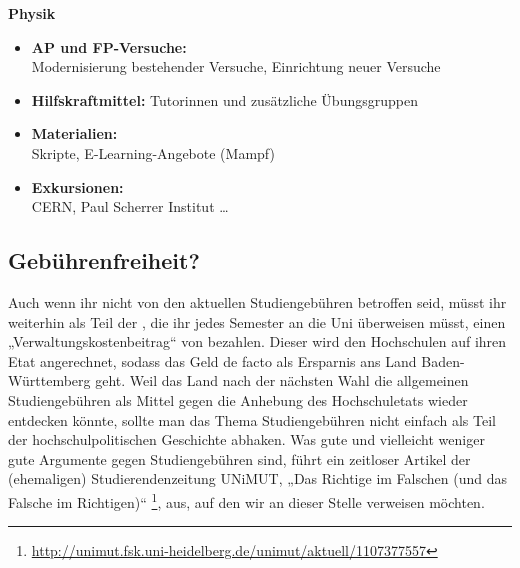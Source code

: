 \noindent\textbf{Physik}
\begin{itemize}
\item \textbf{\gls{AP} und \gls{FP}-Versuche:}\\
	Modernisierung bestehender Versuche, Einrichtung neuer Versuche
\item \textbf{Hilfskraftmittel:}
	Tutorinnen und zusätzliche Übungsgruppen
\item \textbf{Materialien:}\\
	Skripte, E-Learning-Angebote (Mampf)
\item \textbf{Exkursionen:}\\
	CERN, Paul Scherrer Institut \dots
\end{itemize}


\subsection{Gebührenfreiheit?}
Auch wenn ihr nicht von den aktuellen Studiengebühren betroffen seid, müsst ihr weiterhin als Teil der \EUR{\beitragssumme}, die ihr jedes Semester an die Uni überweisen müsst, einen „Verwaltungskostenbeitrag“ von \EUR{\verwaltungsbetrag} bezahlen. Dieser wird den Hochschulen auf ihren Etat angerechnet, sodass das Geld de facto als Ersparnis ans Land Baden-Württemberg geht. Weil das Land nach der nächsten Wahl die allgemeinen Studiengebühren als Mittel gegen die Anhebung des Hochschuletats wieder entdecken könnte, sollte man das Thema Studiengebühren nicht einfach als Teil der hochschulpolitischen Geschichte abhaken. Was gute und vielleicht weniger gute Argumente gegen Studiengebühren sind, führt ein zeitloser Artikel der (ehemaligen) Studierendenzeitung UNiMUT, „Das Richtige im Falschen (und das Falsche im Richtigen)“  \footnote{\url{http://unimut.fsk.uni-heidelberg.de/unimut/aktuell/1107377557}}, aus, auf den wir an dieser Stelle verweisen möchten.




